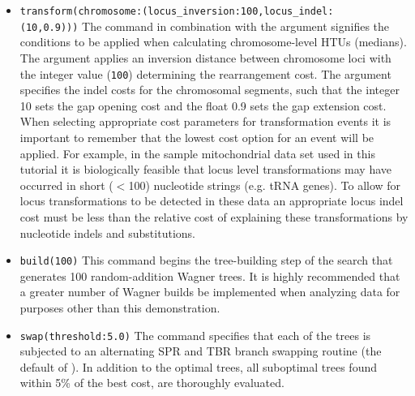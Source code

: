 \begin{itemize}
(\texttt{mauveout}), which when read into Mauve \cite{darlingetal2004},
can track the movement of LCBs between sequences.  Here, Mauve
alignment files will be generated with the names ``mauve\_i\_j.alignment''
where i and j are median states. Sequence ambiguities will not be
resolved to generate additional medians beyond those determined by
the data (). These files can be
used in conjunction with the  output to
determine inferred rearrangement events. In the analysis of unannotated
chromosomes, the data {\bf must} be transformed to
 when using the Mauve aligner.  
\item \texttt{transform(chromosome:(locus\_inversion:100,locus\_indel:\\(10,0.9)))}
The  command in combination with the argument
 signifies the conditions to be applied
when calculating chromosome-level HTUs (medians).  The argument
 applies an inversion distance between
chromosome loci with the integer value (\texttt{100}) determining
the rearrangement cost. The argument 
specifies the indel costs for the chromosomal segments, such that
the integer 10 sets the gap opening cost and the float 0.9 sets the gap extension
cost.  When selecting appropriate cost parameters for transformation
events it is important to remember that the lowest cost option for
an event will be applied. For example, in the sample mitochondrial
data set used in this tutorial it is biologically feasible that
locus level transformations may have occurred in short ($<$100)
nucleotide strings (e.g. tRNA genes). To allow for locus transformations
to be detected in these data an appropriate locus indel cost must
be less than the relative cost of explaining these transformations
by nucleotide indels and substitutions.  
\item \texttt{build(100)} This command begins the tree-building step 
of the search that generates 100 random-addition Wagner trees. 
It is highly recommended that a greater number of Wagner builds 
be implemented when analyzing data for purposes other than this demonstration.  
\item \texttt{swap(threshold:5.0)} The  command specifies
that each of the trees is subjected to an alternating SPR and TBR
branch swapping routine (the default of \poy). In addition to the 
optimal trees, all suboptimal trees found within 5\% of the
best cost, are thoroughly evaluated.  

\end{itemize}
